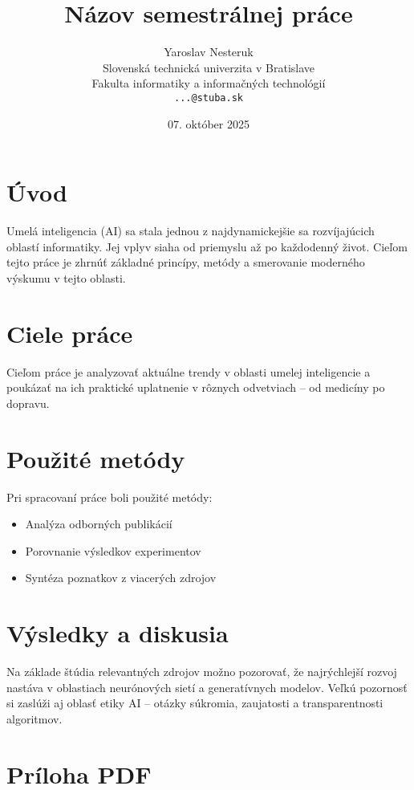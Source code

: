 \documentclass{article}  %
\title{Názov semestrálnej práce}
\author{Yaroslav Nesteruk \\ 
        {\small Slovenská technická univerzita v Bratislave} \\ 
        {\small Fakulta informatiky a informačných technológií} \\ 
        {\small \texttt{...@stuba.sk}}}
\date{07. október 2025}
\begin{document}
\maketitle

\section{Úvod}
Umelá inteligencia (AI) sa stala jednou z najdynamickejšie sa rozvíjajúcich oblastí informatiky. 
Jej vplyv siaha od priemyslu až po každodenný život. Cieľom tejto práce je zhrnúť základné princípy, 
metódy a smerovanie moderného výskumu v tejto oblasti.

\section{Ciele práce}
Cieľom práce je analyzovať aktuálne trendy v oblasti umelej inteligencie a poukázať na ich praktické 
uplatnenie v rôznych odvetviach – od medicíny po dopravu.

\section{Použité metódy}
Pri spracovaní práce boli použité metódy:
\begin{itemize}
    \item Analýza odborných publikácií
    \item Porovnanie výsledkov experimentov
    \item Syntéza poznatkov z viacerých zdrojov
\end{itemize}

\section{Výsledky a diskusia}
Na základe štúdia relevantných zdrojov možno pozorovať, že najrýchlejší rozvoj nastáva v oblastiach 
neurónových sietí a generatívnych modelov. Veľkú pozornosť si zaslúži aj oblasť etiky AI – otázky súkromia, 
zaujatosti a transparentnosti algoritmov.

\section{Príloha PDF}

\end{document}
